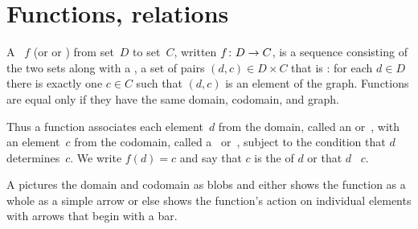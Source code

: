 \documentclass{test}  %
\begin{document}











\chapter{Functions, relations}
\begin{df}
A ~$f$ (or  or ) 
from  set~$D$
to  set~$C$, written $\mbox{$f\colon D\to C$}$,
is a sequence consisting of the two sets along with a , 
a set of pairs $(d,c)\in D\times C$ that is 
: for each $d\in D$ there is
exactly one $c\in C$ such that $(d,c)$ is an element of the graph. 
Functions are equal only if they have the same domain, codomain,
and graph.
\end{df}

\noindent Thus a function associates each element~$d$ from the domain,
called an  or~,
with an element~$c$ from the codomain, 
called a~ or~,
subject to the condition that $d$ determines~$c$. 
We write $f(d)=c$ and say that $c$ is the  of $d$ 
or that $d$ ~$c$.

A  pictures the domain and 
codomain as blobs and 
either shows the function as a whole as a simple arrow   
or else shows the function's action on individual elements 
with arrows that begin with a bar.
\begin{center}
  \hspace{8em}
\end{center}
\end{document}
